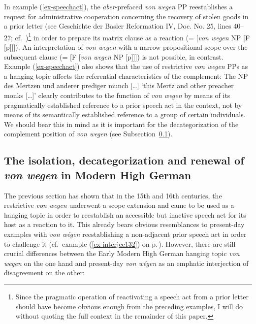 \documentclass[output=paper
  ,nobabel
  ,draftmode
  ,babelshorthands
  ,colorlinks, citecolor=brown
]{langscibook}
\begin{document}
\noindent
In example (\ref{ex-speechact}), the \emph{aber}-prefaced \emph{von wegen} PP reestablishes a request for administrative cooperation concerning the recovery of stolen goods in a prior letter (see Geschichte der Basler Reformation IV, Doc. No. 25, lines 40--27; cf.\ \citealt[26--27]{Roth1941})\footnote{Since the pragmatic operation of reactivating a speech act from a prior letter should have become obvious enough from the preceding examples, I will do without quoting the full context in the remainder of this paper.}  
in order to prepare its matrix clause as a reaction (= [\emph{von wegen} NP [F [p]]]). An interpretation of \emph{von wegen} with a narrow propositional scope over the subsequent clause (= [F [\emph{von wegen} NP [p]]]) is not possible, in contrast. Example (\ref{ex-speechact}) also shows that the use of restrictive \emph{von wegen} PPs as a hanging topic affects the referential characteristics of the complement: The NP des Mertzen und anderer prediger munch [\ldots] `this Mertz and other preacher monks [\ldots]' clearly contributes to the function of \emph{von wegen} by means of its pragmatically established reference to a prior speech act in the context, not by means of its semantically established reference to a group of certain individuals. We should bear this in mind as it is important for the decategorization of the complement position of \emph{von wegen} (see Subsection~\ref{ssec-mhd-vw}).

\subsection{The isolation, decategorization and renewal of \emph{von wegen} in Modern High German}\label{ssec-mhd-vw}

The previous section has shown that in the 15th and 16th centuries, the restrictive \emph{von wegen}
underwent a scope extension and came to be used as a hanging topic in order to reestablish an
accessible but inactive speech act for its host as a reaction to it. This already bears obvious
resemblances to present-day  examples with \emph{von wégen} reestablishing a non-adjacent
prior speech act in order to challenge it (cf.\ example (\ref{ex-interjec132}) on p.\,\pageref{ex-interjec132}). However, there are still crucial differences between the Early Modern High German hanging topic \emph{von wegen} on the one hand and present-day  \emph{von wégen} as an emphatic interjection of disagreement on the other:
\end{document}
